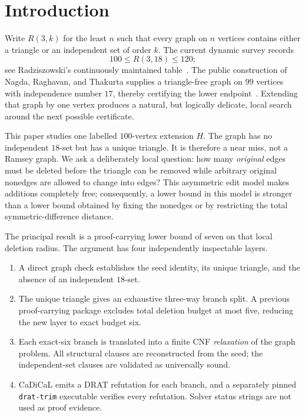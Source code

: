 \section{Introduction}

Write \(R(3,k)\) for the least \(n\) such that every graph on \(n\) vertices
contains either a triangle or an independent set of order \(k\).  The current
dynamic survey records
\[
  100\le R(3,18)\le 120;
\]
see Radziszowski's continuously maintained table~\cite{Radziszowski2026}.
The public construction of Nagda, Raghavan, and Thakurta supplies a
triangle-free graph on \(99\) vertices with independence number \(17\),
thereby certifying the lower endpoint~\cite{NagdaRaghavanThakurta2026}.
Extending that graph by one vertex produces a natural, but logically delicate,
local search around the next possible certificate.

This paper studies one labelled \(100\)-vertex extension \(H\).  The graph
has no independent \(18\)-set but has a unique triangle.  It is therefore a
near miss, not a Ramsey graph.  We ask a deliberately local question: how
many \emph{original} edges must be deleted before the triangle can be removed
while arbitrary original nonedges are allowed to change into edges?  This
asymmetric edit model makes additions completely free; consequently, a lower
bound in this model is stronger than a lower bound obtained by fixing the
nonedges or by restricting the total symmetric-difference distance.

The principal result is a proof-carrying lower bound of seven on that local
deletion radius.  The argument has four independently inspectable layers.

\begin{enumerate}[label=(\roman*)]
\item A direct graph check establishes the seed identity, its unique
  triangle, and the absence of an independent \(18\)-set.
\item The unique triangle gives an exhaustive three-way branch split.  A
  previous proof-carrying package excludes total deletion budget at most
  five, reducing the new layer to exact budget six.
\item Each exact-six branch is translated into a finite CNF \emph{relaxation}
  of the graph problem.  All structural clauses are reconstructed from the
  seed; the independent-set clauses are validated as universally sound.
\item CaDiCaL emits a DRAT refutation for each branch, and a separately pinned
  \texttt{drat-trim} executable verifies every refutation.  Solver status
  strings are not used as proof evidence.
\end{enumerate}

